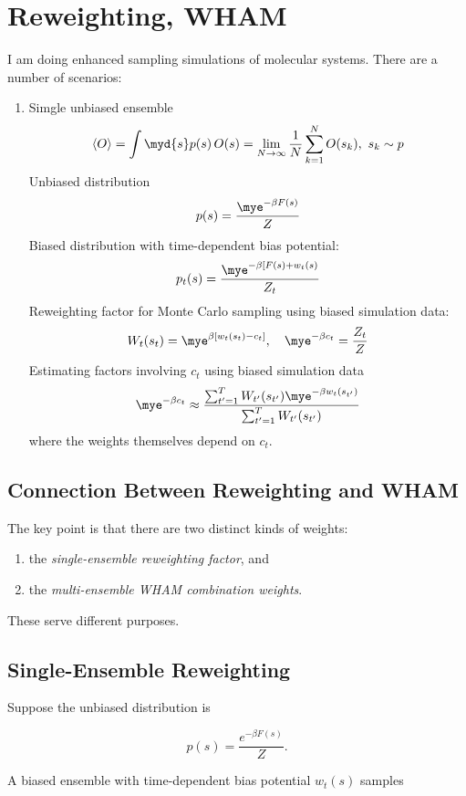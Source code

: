 \section{Reweighting, WHAM}
I am doing enhanced sampling simulations of molecular systems.  There are a number of scenarios:
\begin{enumerate}
    \item Simgle unbiased ensemble
    \[
        \langle O\rangle = \int\myd{s}p(s)\,O(s)
        =\lim_{N\rightarrow\infty} \frac{1}{N}\sum_{k=1}^N O(s_k), ~s_k\sim p
    \]
    Unbiased distribution
    \[
    p(s) = \frac{\mye^{-\beta F(s)}}{Z}
    \]
    Biased distribution with time-dependent bias potential:
    \[
        p_t(s) = \frac{\mye^{-\beta [F(s)+ w_t(s)}}{Z_t}
    \]
    Reweighting factor for Monte Carlo sampling using biased simulation data:
    \[
        W_t(s_t) = \mye^{\beta[w_t(s_t)-c_t]} ,~~~\mye^{-\beta c_t} = \frac{Z_t}{Z}
    \]
    Estimating factors involving $c_t$ using biased simulation data
    \[
        \mye^{-\beta c_t} \approx \frac{\sum_{t'=1}^T W_{t'}(s_{t'})\mye^{-\beta w_t(s_{t'})}}{\sum_{t'=1}^T W_{t'}(s_{t'})}
    \]
    where the weights themselves depend on $c_t$.
\end{enumerate}

\subsection{Connection Between Reweighting and WHAM}

The key point is that there are two distinct kinds of weights:

\begin{enumerate}
    \item the \emph{single-ensemble reweighting factor}, and
    \item the \emph{multi-ensemble WHAM combination weights}.
\end{enumerate}

These serve different purposes.

\subsection{Single-Ensemble Reweighting}

Suppose the unbiased distribution is

\[
p(s)=\frac{e^{-\beta F(s)}}{Z}.
\]

A biased ensemble with time-dependent bias potential \(w_t(s)\) samples

